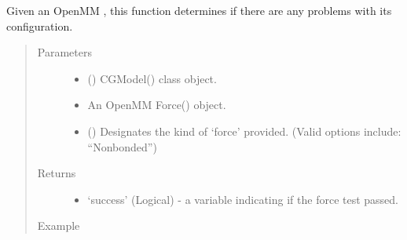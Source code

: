 \documentclass[letterpaper,12pt,english,openany,oneside]{sphinxmanual}
\begin{document}

\begin{fulllineitems}
\label{\detokenize{build:build.cg_build.test_force}}
Given an OpenMM , this function determines if there are any problems with its configuration.
\begin{quote}\begin{description}
\item[{Parameters}] \leavevmode\begin{itemize}
\item {} 
 () \textendash{} CGModel() class object.

\item {} 
 \textendash{} An OpenMM Force() object.

\item {} 
 () \textendash{} Designates the kind of ‘force’ provided. (Valid options include: “Nonbonded”)

\end{itemize}

\item[{Returns}] \leavevmode
\begin{itemize}
\item {} 
‘success’ (Logical) - a variable indicating if the force test passed.

\end{itemize}


\item[{Example}] \leavevmode
\end{description}\end{quote}


\end{fulllineitems}
\end{document}
